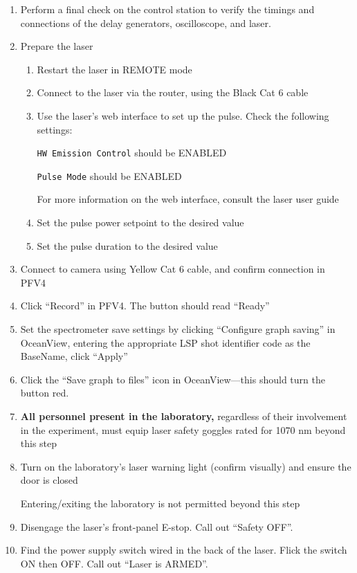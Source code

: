 \begin{enumerate}
\def\labelenumi{\arabic{enumi}.}
\item
  Perform a final check on the control station to verify the timings and
  connections of the delay generators, oscilloscope, and laser.
\item
  Prepare the laser

  \begin{enumerate}
  \def\labelenumii{\arabic{enumii}.}
  \item
    Restart the laser in REMOTE mode
  \item
    Connect to the laser via the router, using the Black Cat 6 cable
  \item
    Use the laser's web interface to set up the pulse. Check the
    following settings:

    \texttt{HW\ Emission\ Control} should be ENABLED

    \texttt{Pulse\ Mode} should be ENABLED

    {\color{cyan}For more information on the web interface, consult the laser user
    guide}
  \item
    Set the pulse power setpoint to the desired value
  \item
    Set the pulse duration to the desired value
  \end{enumerate}
\item
  Connect to camera using Yellow Cat 6 cable, and confirm connection in
  PFV4
\item
  Click ``Record'' in PFV4. The button should read ``Ready''
\item
  Set the spectrometer save settings by clicking ``Configure graph
  saving'' in OceanView, entering the appropriate LSP shot identifier
  code as the BaseName, click ``Apply''
\item
  Click the ``Save graph to files'' icon in OceanView---this should turn
  the button red.
\item
  \textbf{All
  personnel present in the
  laboratory,}
  regardless of their involvement in the experiment,
  must
  equip laser safety goggles rated for 1070 nm beyond this
  step
\item
  Turn on the laboratory's laser warning light (confirm visually) and
  ensure the door is closed

  {\color{McGillRed}Entering/exiting the laboratory is not permitted beyond this step}
\item
  Disengage the laser's front-panel E-stop. Call out ``Safety OFF''.
\item
  Find the power supply switch wired in the back of the laser. Flick the
  switch ON then OFF. Call out ``Laser is ARMED''.


\end{enumerate}
